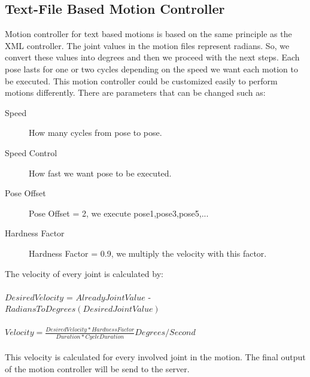 \subsection{Text-File Based Motion Controller}
Motion controller for text based motions is based on the same principle as the XML controller. The joint values in the motion files represent radians. So, we convert these values into degrees and then we proceed with the next steps. Each pose lasts for one or two cycles depending on the speed we want each motion to be executed. This motion controller could be customized easily to perform motions differently. There are parameters that can be changed such as:
\begin{description}
	\item[Speed] How many cycles from pose to pose.
	\item[Speed Control] How fast we want pose to be executed.
	\item[Pose Offset] Pose Offset = 2, we execute pose1,pose3,pose5,...
	\item[Hardness Factor]	Hardness Factor = 0.9, we multiply the velocity with this factor.
\end{description}
The velocity of every joint is calculated by:\\
\\
$Desired Velocity$ = $Already Joint Value$ - $RadiansToDegrees(Desired Joint Value)$
\\
\\
$Velocity = \frac {Desired Velocity \ast Hardness Factor} {Duration
 \ast CycleDuration} Degrees/Second$\\
\\
This velocity is calculated for every involved joint in the motion. The final output of the motion controller will be send to the server.

